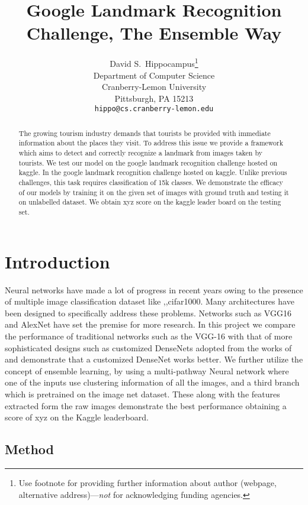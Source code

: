 \documentclass{article}
\title{Google Landmark Recognition Challenge, The Ensemble Way }
\author{
  David S.~Hippocampus\thanks{Use footnote for providing further
    information about author (webpage, alternative
    address)---\emph{not} for acknowledging funding agencies.} \\
  Department of Computer Science\\
  Cranberry-Lemon University\\
  Pittsburgh, PA 15213 \\
  \texttt{hippo@cs.cranberry-lemon.edu} \\
}
\begin{document}

\maketitle

\begin{abstract}
 The growing tourism industry demands that tourists be provided with immediate information about the places they visit.
 To address this issue we provide a framework which aims to detect and correctly recognize a landmark from images taken by tourists. 
 We test our model on the google landmark recognition challenge hosted on kaggle. 
 In the google landmark recognition challenge hosted on kaggle. 
 Unlike previous challenges, this task requires classification of 15k classes. We demonstrate the efficacy of our models by training it on the given set of images with ground truth and testing it on unlabelled dataset.
 We obtain xyz score on the kaggle leader board on the testing set.  
 
\end{abstract}

\section{Introduction}

Neural networks have made a lot of progress in recent years owing to the presence of multiple image classification dataset like  {\cite{imagenet},\cite{cifar10},cifar{1000}}.
Many architectures have been designed to specifically address these problems. Networks such as VGG16 {\cite{VGG}} and AlexNet {\cite{Alexnet}} have set the premise for more research.
In this project we compare the performance of traditional networks such as the VGG-16  with that of more sophisticated designs such as customized DenseNets adopted from the works of {\cite {huang_densely}} and demonstrate that a customized DenseNet works better.
We further utilize the concept of ensemble learning, by using a multi-pathway Neural network where one of the inputs use clustering information of all the images, and a third branch which is pretrained on the image net dataset. These along with the features extracted form the raw images demonstrate the best performance obtaining a score of xyz on the Kaggle leaderboard.



\subsection{Method}
\end{document}
